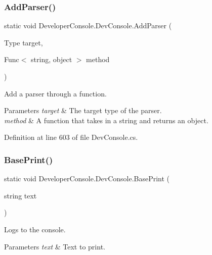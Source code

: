 \subsubsection{\texorpdfstring{Add\+Parser()}{AddParser()}\hspace{0.1cm}{\footnotesize\ttfamily [3/3]}}
{\footnotesize\ttfamily static void Developer\+Console.\+Dev\+Console.\+Add\+Parser (\begin{DoxyParamCaption}\item[{Type}]{target,  }\item[{Func$<$ string, object $>$}]{method }\end{DoxyParamCaption})\hspace{0.3cm}{\ttfamily [static]}}



Add a parser through a function. 


\begin{DoxyParams}{Parameters}
{\em target} & The target type of the parser. \\
\hline
{\em method} & A function that takes in a string and returns an object. \\
\hline
\end{DoxyParams}


Definition at line 603 of file Dev\+Console.\+cs.

\mbox{\label{class_developer_console_1_1_dev_console_a1133667062aefe90b952db9a08e1ede5}} 
\subsubsection{\texorpdfstring{Base\+Print()}{BasePrint()}}
{\footnotesize\ttfamily static void Developer\+Console.\+Dev\+Console.\+Base\+Print (\begin{DoxyParamCaption}\item[{string}]{text }\end{DoxyParamCaption})\hspace{0.3cm}{\ttfamily [static]}}



Logs to the console. 


\begin{DoxyParams}{Parameters}
{\em text} & Text to print.\\
\hline
\end{DoxyParams}


